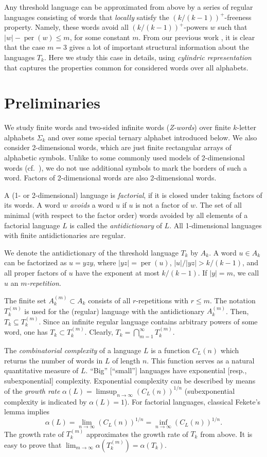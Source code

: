 \documentclass[submission,copyright]{eptcs}\providecommand{\event}{WORDS 2011}
\DeclareMathOperator{\per}{per}
\begin{document}
Any threshold language can be approximated from above by a series of regular languages consisting of words that \textit{locally} satisfy the $(k/(k{-}1))^+\!$-freeness property. Namely, these words avoid all $(k/(k{-}1))^+\!$-powers $w$ such that $|w|-\per(w)\le m$, for some constant $m$. From our previous work \cite{ShGo}, it is clear that the case $m=3$ gives a lot of important structural information about the languages $T_k$. Here we study this case in details, using \textit{cylindric representation} that captures the properties common for considered words over all alphabets.

\section {Preliminaries}

We study finite words and two-sided infinite words (\textit{Z-words}) over finite $k$-letter alphabets $\Sigma_k$ and over some special ternary alphabet introduced below. We also consider 2-dimensional words, which are just finite rectangular arrays of alphabetic symbols. Unlike to some commonly used models of 2-dimensional words (cf.~\cite{2D}), we do not use additional symbols to mark the borders of such a word. Factors of 2-dimensional words are also 2-dimensional words.

A (1- or 2-dimensional) language is \textit{factorial}, if it is closed under taking factors of its words. A word $w$ \textit{avoids} a word $u$ if $u$ is not a factor of $w$. The set of all minimal (with respect to the factor order) words avoided by all elements of a factorial language $L$ is called the {\it antidictionary} of $L$. All 1-dimensional languages with finite antidictionaries are regular.

We denote the antidictionary of the threshold language $T_k$ by $A_k$. A word $u\in A_k$ can be factorized as $u=yzy$, where $|yz|=\per(u)$, $|u|/|yz|>k/(k{-}1)$, and all proper factors of $u$ have the exponent at most $k/(k{-}1)$. If $|y|=m$, we call $u$ an \textit{$m$-repetition}.

The finite set $A_k^{(m)}\subset A_k$ consists of all $r$-repetitions with $r\le m$. The notation $T_k^{(m)}$ is used for the (regular) language with the antidictionary $A_k^{(m)}$. Then, $T_k\subseteq T_k^{(m)}$. Since an infinite regular language contains arbitrary powers of some word, one has $T_k\subset T_k^{(m)}$. Clearly, $T_k=\bigcap_{m=1}^{\infty}T_k^{(m)}$.

The \textit{combinatorial complexity} of a language $L$ is a function $C_L(n)$ which returns the number of words in $L$ of length $n$. This function serves as a natural quantitative measure of $L$. ``Big'' [``small''] languages have exponential [resp., subexponential] complexity. Exponential complexity can be described by means of the \textit{growth rate} $\alpha(L)=\limsup_{n\to\infty}(C_L(n))^{1/n}$ (subexponential complexity is indicated by $\alpha(L)=1$). For factorial languages, classical Fekete's lemma implies 
$$
\alpha(L)=\lim_{n\to\infty}(C_L(n))^{1/n}=\inf_{n\to\infty}(C_L(n))^{1/n}.
$$
The growth rate of $T_k^{(m)}$ approximates the growth rate of $T_k$ from above. It is easy to prove that $\lim_{m\to\infty}\alpha(T_k^{(m)})=\alpha(T_k)$.
\end{document}
